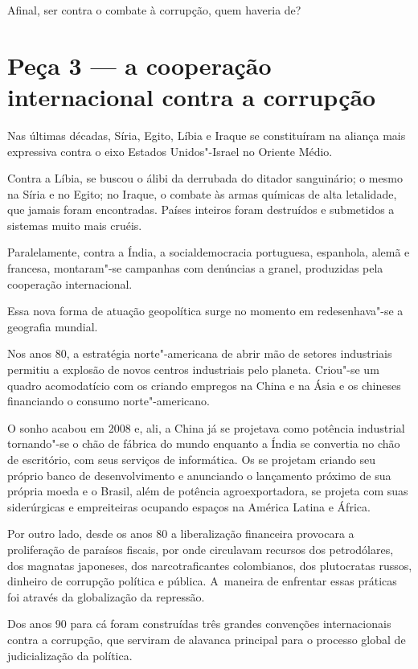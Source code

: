 Afinal, ser contra o combate à corrupção, quem haveria de?

\section{Peça 3 --- a cooperação internacional contra a corrupção}

Nas últimas décadas, Síria, Egito, Líbia e Iraque se constituíram na
aliança mais expressiva contra o eixo Estados Unidos"-Israel no Oriente
Médio.

Contra a Líbia, se buscou o álibi da derrubada do ditador sanguinário; o
mesmo na Síria e no Egito; no Iraque, o combate às armas químicas de
alta letalidade, que jamais foram encontradas. Países inteiros foram
destruídos e submetidos a sistemas muito mais cruéis.

Paralelamente, contra a Índia, a socialdemocracia portuguesa, espanhola,
alemã e francesa, montaram"-se campanhas com denúncias a granel,
produzidas pela cooperação internacional.

Essa nova forma de atuação geopolítica surge no momento em
redesenhava"-se a geografia mundial.

Nos anos 80, a estratégia norte"-americana de abrir mão de setores
industriais permitiu a explosão de novos centros industriais pelo
planeta. Criou"-se um quadro acomodatício com os  criando empregos na
China e na Ásia e os chineses financiando o consumo norte"-americano.

O sonho acabou em 2008 e, ali, a China já se projetava como potência
industrial tornando"-se o chão de fábrica do mundo enquanto a Índia se
convertia no chão de escritório, com seus serviços de informática. Os
 se projetam criando seu próprio banco de desenvolvimento e
anunciando o lançamento próximo de sua própria moeda e o Brasil, além de
potência agroexportadora, se projeta com suas siderúrgicas e
empreiteiras ocupando espaços na América Latina e África.

Por outro lado, desde os anos 80 a liberalização financeira provocara a
proliferação de paraísos fiscais, por onde circulavam recursos dos
petrodólares, dos magnatas japoneses, dos narcotraficantes colombianos,
dos plutocratas russos, dinheiro de corrupção política e pública. A~maneira de enfrentar essas práticas foi através da globalização da
repressão.

Dos anos 90 para cá foram construídas três grandes convenções
internacionais contra a corrupção, que serviram de alavanca principal
para o processo global de judicialização da política.

